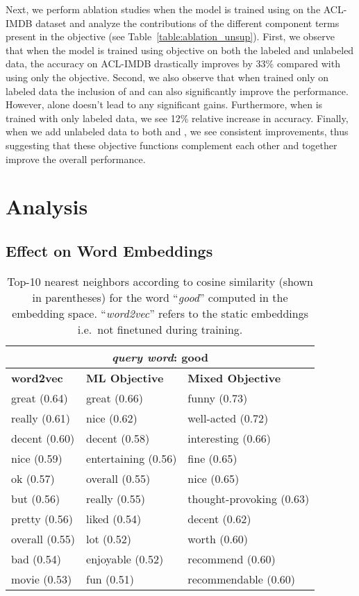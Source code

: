 \documentclass[letterpaper]{article}
\begin{document}
Next, we perform ablation studies when the model is trained using  on the ACL-IMDB dataset and analyze the contributions of the different component terms present in the objective (see Table~\ref{table:ablation_unsup}). First, we observe that when the model is trained using  objective on both the labeled and unlabeled data, the accuracy on ACL-IMDB drastically improves by 33\% compared with using only the  objective. Second, we also observe that when trained only on labeled data the inclusion of  and  can also significantly improve the performance. However,  alone doesn't lead to any significant gains. Furthermore, when  is trained with only labeled data, we see 12\% relative increase in accuracy. Finally, when we add unlabeled data to both  and , we see consistent improvements, thus suggesting that these objective functions complement each other and together improve the overall performance.

\section{Analysis}                        \label{sec:analysis}

\subsection{Effect on Word Embeddings}
\begin{table}[!htb]
\small
\centering
\begin{tabular}{@{}l | l | l@{}} 
\toprule
\multicolumn{3}{c}{\emph{query word}: good} \\
\midrule
\textbf{word2vec} & \textbf{ML Objective} & \textbf{Mixed Objective} \\ 
\midrule
great (0.64) & great (0.66) & funny (0.73) \\
really (0.61) & nice (0.62) & well-acted (0.72) \\
decent (0.60) & decent (0.58) & interesting (0.66) \\
nice (0.59) & entertaining (0.56) & fine (0.65) \\
ok (0.57) & overall (0.55) & nice (0.65) \\
but (0.56) & really (0.55) & thought-provoking (0.63) \\
pretty (0.56) & liked (0.54) & decent (0.62) \\
overall (0.55) & lot (0.52) & worth (0.60) \\
bad (0.54) & enjoyable (0.52) & recommend (0.60) \\
movie (0.53) & fun (0.51) & recommendable (0.60) \\
\bottomrule
\end{tabular}
\caption{Top-10 nearest neighbors according to cosine similarity (shown in parentheses) for the word ``\emph{good}'' computed in the embedding space. ``\emph{word2vec}'' refers to the static embeddings i.e.\ not finetuned during training.}
\label{table:t-sne}
\end{table}
\end{document}
